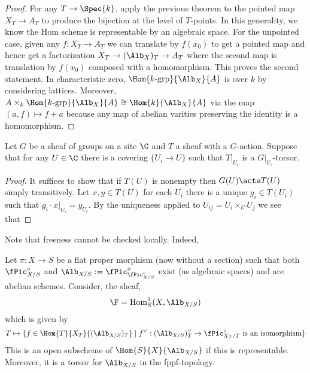 \documentclass[12pt]{article}
\begin{document}
\begin{proof}
For any $T \to \Spec{k}$, apply the previous theorem to the pointed map $X_T \to A_T$ to produce the bijection at the level of $T$-points. In this generality, we know the Hom scheme is representable by an algebraic space. For the unpointed case, given any $f : X_T \to A_T$ we can translate by $f(x_0)$ to get a pointed map and hence get a factorization $X_T \to (\Alb_{X})_T \to A_T$ where the second map is translation by $f(x_0)$ composed with a homomorphism. This proves the second statement. In characteristic zero, $\Hom{k\text{-grp}}{\Alb_X}{A}$ is \etale over $k$ by considering lattices. Moreover, $A \times_k \Hom{k\text{-grp}}{\Alb_X}{A} \cong \Hom{k}{\Alb_X}{A}$ via the map $(a, f) \mapsto f + a$ because any map of abelian varities preserving the identity is a homomorphism.   
\end{proof}


\newcommand{\fHom}{\mathrm{Hom}}

\begin{lemma}
Let $G$ be a sheaf of groups on a site $\C$ and $T$ a sheaf with a $G$-action. Suppose that for any $U \in \C$ there is a covering $\{ U_i \to U \}$ such that $T|_{U_i}$ is a $G|_{U_i}$-torsor.
\end{lemma}

\begin{proof}
It suffices to show that if $T(U)$ is nonempty then $G(U) \acts T(U)$ simply transitively. Let $x,y \in T(U)$ for each $U_i$ there is a unique $g_i \in T(U_i)$ such that $g_i \cdot x|_{U_i} = y_{U_i}$. By the uniqueness applied to $U_{ij} = U_i \times_U U_j$ we see that 
\end{proof}

\begin{rmk}
Note that freeness cannot be checked locally. Indeed, 
\end{rmk}

\begin{prop}
Let $\pi : X \to S$ be a flat proper morphism (now without a section) such that both $\fPic_{X/S}^\circ$ and $\Alb_{X/S} := \fPic_{\fPic_{X/S}^\circ}^\circ$ exist (as algebraic spaces) and are abelian schemes. Consider, the sheaf,
\[ \F = \fHom_S^1(X, \Alb_{X/S}) \] 
which is given by 
\[ T \mapsto \{f \in \Hom{T}{X_T}{(\Alb_{X/S})_T} \mid f^\vee : (\Alb_{X/S})_T^\vee \to \fPic_{X_T/T}^\circ \text{ is an isomorphism} \} \]
This is an open subscheme of $\Hom{S}{X}{\Alb_{X/S}}$ if this is representable. Moreover, it is a torsor for $\Alb_{X/S}$ in the fppf-topology.
\end{prop}
\end{document}

